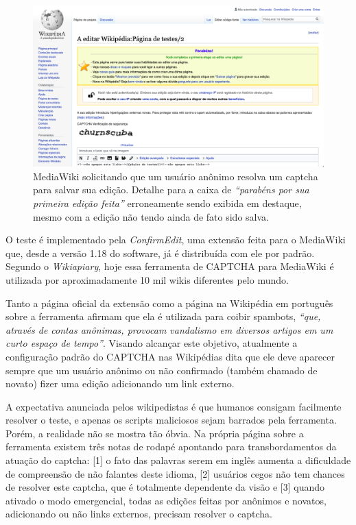 \begin{figure}[H]
    \centering
    \includegraphics[width=1\textwidth]{Images/mediawiki_solicita_captcha.png}
    \caption{MediaWiki solicitando que um usuário anônimo resolva um captcha para salvar sua edição. Detalhe para a caixa de \textit{“parabéns por sua primeira edição feita”} erroneamente sendo exibida em destaque, mesmo com a edição não tendo ainda de fato sido salva.}
    \label{fig:mediawiki_solicita_captcha}
\end{figure}

O teste é implementado pela \textit{ConfirmEdit}, uma extensão feita para o MediaWiki que, desde a versão 1.18 do software, já é distribuída com ele por padrão. Segundo o \textit{Wikiapiary}, hoje essa ferramenta de CAPTCHA para MediaWiki é utilizada por aproximadamente 10 mil wikis diferentes pelo mundo\citep{extension_confirm_edit}.

Tanto a página oficial da extensão como a página na Wikipédia em português sobre a ferramenta  afirmam que ela é utilizada para coibir spambots, \textit{“que, através de contas anônimas, provocam vandalismo em diversos artigos em um curto espaço de tempo”}. Visando alcançar este objetivo, atualmente a configuração padrão do CAPTCHA nas Wikipédias dita que ele deve aparecer sempre que um usuário anônimo ou não confirmado (também chamado de novato) fizer uma edição adicionando um link externo.

A expectativa anunciada pelos wikipedistas é que humanos consigam facilmente resolver o teste, e apenas os scripts maliciosos sejam barrados pela ferramenta. Porém, a realidade não se mostra tão óbvia. Na própria página sobre a ferramenta existem três notas de rodapé apontando para transbordamentos da atuação do captcha: [1] o fato das palavras serem em inglês aumenta a dificuldade de compreensão de não falantes deste idioma, [2] usuários cegos não tem chances de resolver este captcha, que é totalmente dependente da visão e [3] quando ativado o modo emergencial, todas as edições feitas por anônimos e novatos, adicionando ou não links externos, precisam resolver o captcha. 

